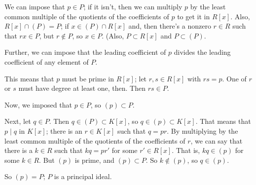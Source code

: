 \documentclass[a4paper,12pt]{article}
\newcommand{\shunt}{\vspace{20mm}}
\begin{document}
We can impose that $p \in P$; if it isn't, then we can multiply $p$ by the least common multiple of the quotients of the coefficients of $p$ to get it in $R[x]$. Also, $R[x] \cap (P) = P$; if $x \in (P) \cap R[x]$ and, then there's a nonzero $r \in R$ such that $rx \in P$, but $r \notin P$, so $x \in P$. (Also, $P \subset R[x]$ and $P \subset (P)$.

Further, we can impose that the leading coefficient of $p$ divides the leading coefficient of any element of $P$.

This means that $p$ must be prime in $R[x]$; let $r,s \in R[x]$ with $rs = p$. One of $r$ or $s$ must have degree at least one, then. Then $rs \in P$. %

Now, we imposed that $p \in P$, so $(p) \subset P$.

Next, let $q \in P$. Then $q \in (P) \subset K[x]$, so $q \in (p) \subset K[x]$. That means that $p \mid q$ in $K[x]$; there is an $r \in K[x]$ such that $q=pr$. By multiplying by the least common multiple of the quotients of the coefficients of $r$, we can say that there is a $k \in R$ such that $kq=pr'$ for some $r' \in R[x]$. That is, $kq \in (p)$ for some $k \in R$. But $(p)$ is prime, and $(p) \subset P$. So $k \notin (p)$, so $q \in (p)$.

So $(p) = P$; $P$ is a principal ideal. 


\shunt
\end{document}
